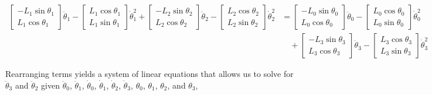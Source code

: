 \documentclass[letterpaper]{article}
\begin{document}
\begin{align}
	\begin{bmatrix} - L_1 \sin \theta_1 \\ L_1 \cos \theta_1 \end{bmatrix} \ddot{\theta}_1 - \begin{bmatrix} L_1 \cos \theta_1 \\ L_1 \sin \theta_1 \end{bmatrix} \dot{\theta}_1^2 + \begin{bmatrix} - L_2 \sin \theta_2 \\ L_2 \cos \theta_2 \end{bmatrix} \ddot{\theta}_2 - \begin{bmatrix} L_2 \cos \theta_2 \\ L_2 \sin \theta_2 \end{bmatrix} \dot{\theta}_2^2 &= \begin{bmatrix} - L_0 \sin \theta_0 \\ L_0 \cos \theta_0 \end{bmatrix} \ddot{\theta}_0 - \begin{bmatrix} L_0 \cos \theta_0 \\ L_0 \sin \theta_0 \end{bmatrix} \dot{\theta}_0^2 \\
		& \quad + \begin{bmatrix} - L_3 \sin \theta_3 \\ L_3 \cos \theta_3 \end{bmatrix} \ddot{\theta}_3 - \begin{bmatrix} L_3 \cos \theta_3 \\ L_3 \sin \theta_3 \end{bmatrix} \dot{\theta}_3^2
\end{align}

\noindent Rearranging terms yields a system of linear equations that allows us to solve for $\ddot{\theta}_3$ and $\ddot{\theta}_2$ given $\ddot{\theta}_0$, $\ddot{\theta}_1$, $\dot{\theta}_0$, $\dot{\theta}_1$, $\dot{\theta}_2$, $\dot{\theta}_3$, $\theta_0$, $\theta_1$, $\theta_2$, and $\theta_3$,
\end{document}
